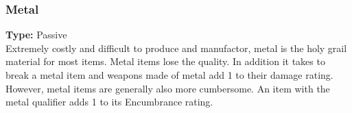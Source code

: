 \subsubsection{Metal}
\label{iqty:metal}
\textbf{Type:} Passive\\
Extremely costly and difficult to produce and manufactor, metal is the holy grail
material for most items. Metal items lose the  quality.
In addition it takes \despair\despair to break a metal item and weapons made of
metal add 1 to their damage rating. However, metal items are generally also more
cumbersome. An item with the metal qualifier adds 1 to its Encumbrance rating.

